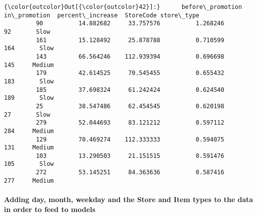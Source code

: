 \documentclass[11pt]{article}
\begin{document}
\begin{Verbatim}[commandchars=\\\{\}]
{\color{outcolor}Out[{\color{outcolor}42}]:}      before\_promotion  in\_promotion  percent\_increase  StoreCode store\_type
         90          14.882682     33.757576          1.268246         92       Slow
         161         15.128492     25.878788          0.710599        164       Slow
         143         66.564246    112.939394          0.696698        145     Medium
         179         42.614525     70.545455          0.655432        183       Slow
         185         37.698324     61.242424          0.624540        189       Slow
         25          38.547486     62.454545          0.620198         27       Slow
         279         52.044693     83.121212          0.597112        284     Medium
         129         70.469274    112.333333          0.594075        131     Medium
         103         13.290503     21.151515          0.591476        105       Slow
         272         53.145251     84.363636          0.587416        277     Medium
\end{Verbatim}
            
    \hypertarget{adding-day-month-weekday-and-the-store-and-item-types-to-the-data-in-order-to-feed-to-models}{%
\paragraph{Adding day, month, weekday and the Store and Item types to
the data in order to feed to
models}\label{adding-day-month-weekday-and-the-store-and-item-types-to-the-data-in-order-to-feed-to-models}}
\end{document}

